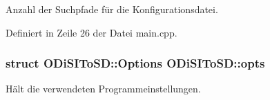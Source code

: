 Anzahl der Suchpfade für die Konfigurationsdatei. 



Definiert in Zeile 26 der Datei main.\-cpp.

\hypertarget{namespaceODiSIToSD_a80beb7db49e15d88897aec916322ec08}{
\subsubsection[{opts}]{\setlength{\rightskip}{0pt plus 5cm}struct {\bf O\-Di\-S\-I\-To\-S\-D\-::\-Options}  O\-Di\-S\-I\-To\-S\-D\-::opts}}\label{namespaceODiSIToSD_a80beb7db49e15d88897aec916322ec08}


Hält die verwendeten Programmeinstellungen. 

